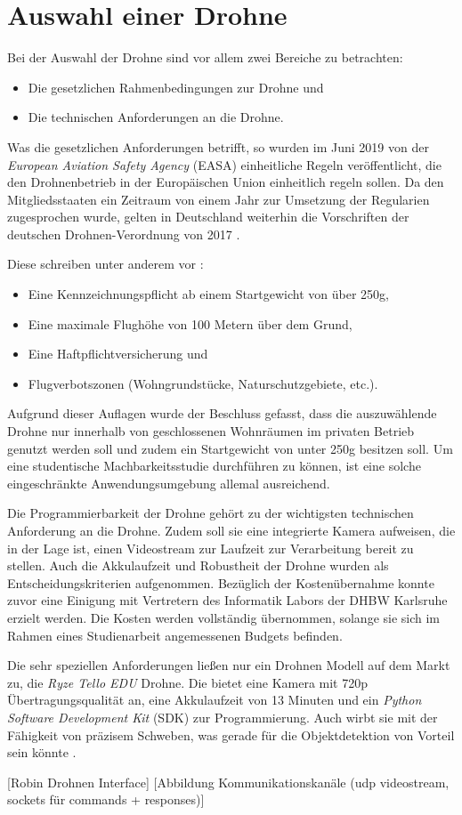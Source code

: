 \section{Auswahl einer Drohne}

Bei der Auswahl der Drohne sind vor allem zwei Bereiche zu betrachten:

\begin{itemize}
	\item Die gesetzlichen Rahmenbedingungen zur Drohne und
	\item Die technischen Anforderungen an die Drohne.
\end{itemize}

Was die gesetzlichen Anforderungen betrifft, so wurden im Juni 2019 von der \textit{European Aviation Safety Agency} (EASA) einheitliche Regeln veröffentlicht, die den Drohnenbetrieb in der Europäischen Union einheitlich regeln sollen. Da den Mitgliedsstaaten ein Zeitraum von einem Jahr zur Umsetzung der Regularien zugesprochen wurde, gelten in Deutschland weiterhin die Vorschriften der deutschen Drohnen-Verordnung von 2017 \cite{EASA.2019}.

Diese schreiben unter anderem vor \cite{Drohnen.de.2020}:
\begin{itemize}
	\item Eine Kennzeichnungspflicht ab einem Startgewicht von über 250g,
	\item Eine maximale Flughöhe von 100 Metern über dem Grund,
	\item Eine Haftpflichtversicherung und
	\item Flugverbotszonen (Wohngrundstücke, Naturschutzgebiete, etc.).
\end{itemize}

Aufgrund dieser Auflagen wurde der Beschluss gefasst, dass die auszuwählende Drohne nur innerhalb von geschlossenen Wohnräumen im privaten Betrieb genutzt werden soll und zudem ein Startgewicht von unter 250g besitzen soll. Um eine studentische Machbarkeitsstudie durchführen zu können, ist eine solche eingeschränkte Anwendungsumgebung allemal ausreichend. 

Die Programmierbarkeit der Drohne gehört zu der wichtigsten technischen Anforderung an die Drohne. Zudem soll sie eine integrierte Kamera aufweisen, die in der Lage ist, einen Videostream zur Laufzeit zur Verarbeitung bereit zu stellen. Auch die Akkulaufzeit und Robustheit der Drohne wurden als Entscheidungskriterien aufgenommen. Bezüglich der Kostenübernahme konnte zuvor eine Einigung mit Vertretern des Informatik Labors der DHBW Karlsruhe erzielt werden. Die Kosten werden vollständig übernommen, solange sie sich im Rahmen eines Studienarbeit angemessenen Budgets befinden.

Die sehr speziellen Anforderungen ließen nur ein Drohnen Modell auf dem Markt zu, die \textit{Ryze Tello EDU} Drohne. Die bietet eine Kamera mit 720p Übertragungsqualität an, eine Akkulaufzeit von 13 Minuten und ein \textit{Python Software Development Kit} (SDK) zur Programmierung. Auch wirbt sie mit der Fähigkeit von präzisem Schweben, was gerade für die Objektdetektion von Vorteil sein könnte \cite{RyzeRobotics.2020}.

[Robin Drohnen Interface] [Abbildung Kommunikationskanäle (udp videostream, sockets für commands + responses)]